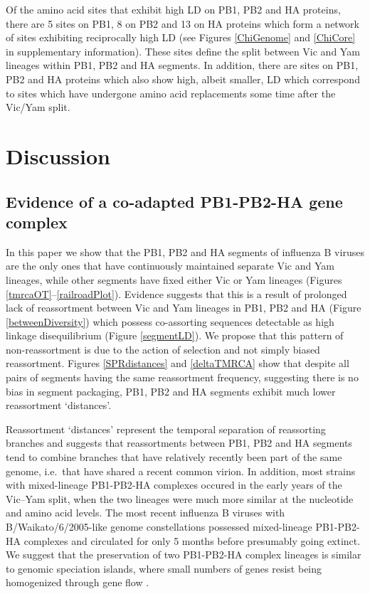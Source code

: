 \documentclass[11pt,oneside,letterpaper]{article}
\begin{document}
Of the amino acid sites that exhibit high LD on PB1, PB2 and HA proteins, there are 5 sites on PB1, 8 on PB2 and 13 on HA proteins which form a network of sites exhibiting reciprocally high LD (see Figures \ref{ChiGenome} and \ref{ChiCore} in supplementary information).
These sites define the split between Vic and Yam lineages within PB1, PB2 and HA segments.
In addition, there are sites on PB1, PB2 and HA proteins which also show high, albeit smaller, LD which correspond to sites which have undergone amino acid replacements some time after the Vic/Yam split.

\section*{Discussion}

\subsection*{Evidence of a co-adapted PB1-PB2-HA gene complex}
In this paper we show that the PB1, PB2 and HA segments of influenza B viruses are the only ones that have continuously maintained separate Vic and Yam lineages, while other segments have fixed either Vic or Yam lineages (Figures \ref{tmrcaOT}--\ref{railroadPlot}).
Evidence suggests that this is a result of prolonged lack of reassortment between Vic and Yam lineages in PB1, PB2 and HA (Figure \ref{betweenDiversity}) which possess co-assorting sequences detectable as high linkage disequilibrium (Figure \ref{segmentLD}).
We propose that this pattern of non-reassortment is due to the action of selection and not simply biased reassortment.
Figures \ref{SPRdistances} and \ref{deltaTMRCA} show that despite all pairs of segments having the same reassortment frequency, suggesting there is no bias in segment packaging, PB1, PB2 and HA segments exhibit much lower reassortment `distances'.

Reassortment `distances' represent the temporal separation of reassorting branches and suggests that reassortments between PB1, PB2 and HA segments tend to combine branches that have relatively recently been part of the same genome, i.e.\ that have shared a recent common virion.
In addition, most strains with mixed-lineage PB1-PB2-HA complexes occured in the early years of the Vic--Yam split, when the two lineages were much more similar at the nucleotide and amino acid levels.
The most recent influenza B viruses with B/Waikato/6/2005-like genome constellations possessed mixed-lineage PB1-PB2-HA complexes and circulated for only 5 months before presumably going extinct.
We suggest that the preservation of two PB1-PB2-HA complex lineages is similar to genomic speciation islands, where small numbers of genes resist being homogenized through gene flow \cite{turner2005}.
\end{document}
